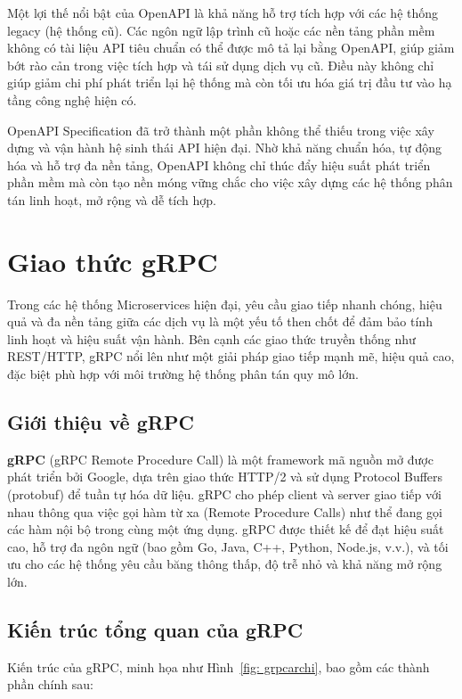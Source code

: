 \documentclass{uetgraduation}
\begin{document}
Một lợi thế nổi bật của OpenAPI là khả năng hỗ trợ tích hợp với các hệ thống legacy (hệ thống cũ). Các ngôn ngữ lập trình cũ hoặc các nền tảng phần mềm không có tài liệu API tiêu chuẩn có thể được mô tả lại bằng OpenAPI, giúp giảm bớt rào cản trong việc tích hợp và tái sử dụng dịch vụ cũ. Điều này không chỉ giúp giảm chi phí phát triển lại hệ thống mà còn tối ưu hóa giá trị đầu tư vào hạ tầng công nghệ hiện có.

OpenAPI Specification đã trở thành một phần không thể thiếu trong việc xây dựng và vận hành hệ sinh thái API hiện đại. Nhờ khả năng chuẩn hóa, tự động hóa và hỗ trợ đa nền tảng, OpenAPI không chỉ thúc đẩy hiệu suất phát triển phần mềm mà còn tạo nền móng vững chắc cho việc xây dựng các hệ thống phân tán linh hoạt, mở rộng và dễ tích hợp.

\section{Giao thức gRPC}

Trong các hệ thống Microservices hiện đại, yêu cầu giao tiếp nhanh chóng, hiệu quả và đa nền tảng giữa các dịch vụ là một yếu tố then chốt để đảm bảo tính linh hoạt và hiệu suất vận hành. Bên cạnh các giao thức truyền thống như REST/HTTP, gRPC nổi lên như một giải pháp giao tiếp mạnh mẽ, hiệu quả cao, đặc biệt phù hợp với môi trường hệ thống phân tán quy mô lớn.

\subsection{Giới thiệu về gRPC}

\textbf{gRPC} \cite{grpc} (gRPC Remote Procedure Call) là một framework mã nguồn mở được phát triển bởi Google, dựa trên giao thức HTTP/2 và sử dụng Protocol Buffers (protobuf) để tuần tự hóa dữ liệu. gRPC cho phép client và server giao tiếp với nhau thông qua việc gọi hàm từ xa (Remote Procedure Calls) như thể đang gọi các hàm nội bộ trong cùng một ứng dụng. gRPC được thiết kế để đạt hiệu suất cao, hỗ trợ đa ngôn ngữ (bao gồm Go, Java, C++, Python, Node.js, v.v.), và tối ưu cho các hệ thống yêu cầu băng thông thấp, độ trễ nhỏ và khả năng mở rộng lớn.

\subsection{Kiến trúc tổng quan của gRPC}

Kiến trúc của gRPC, minh họa như Hình~\ref{fig: grpcarchi}, bao gồm các thành phần chính sau:
\end{document}
